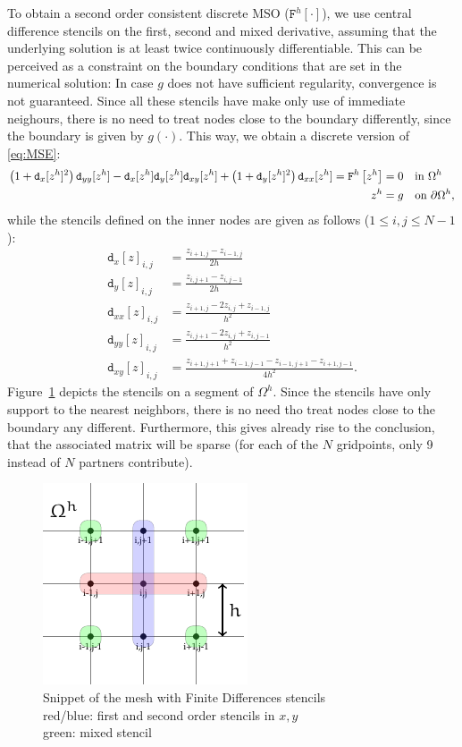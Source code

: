 \documentclass[11pt]{scrartcl}
\newcommand{\mSurfDisc}[1]{\ensuremath{\mathtt{F}^h\left[#1\right]}}
\newcommand{\Dx}[1]{\ensuremath{\mathtt{d}_x[#1]}}
\newcommand{\Dy}[1]{\ensuremath{\mathtt{d}_y[#1]}}
\newcommand{\Dxx}[1]{\ensuremath{\mathtt{d}_{xx}[#1]}}
\newcommand{\Dyy}[1]{\ensuremath{\mathtt{d}_{yy}[#1]}}
\newcommand{\Dxy}[1]{\ensuremath{\mathtt{d}_{xy}[#1]}}
\begin{document}
To obtain a second order consistent discrete MSO ($\mSurfDisc{\cdot}$), we use central difference stencils on the first, second and mixed derivative, assuming that the underlying solution is at least twice continuously differentiable. This can be perceived as a constraint on the boundary conditions that are set in the numerical solution: In case $g$ does not have sufficient regularity, convergence is not guaranteed. Since all these stencils have make only use of immediate neighours, there is no need to treat nodes close to the boundary differently, since the boundary is given by $g(\cdot)$.
\newpage 
This way, we obtain a discrete version of \eqref{eq:MSE}:
\begin{align}
	\left(1+\Dx{z^h}^2\right)\Dyy{z^h}-\Dx{z^h} \Dy{z^h}\Dxy{z^h} + \left(1+\Dy{z^h}^2\right)\Dxx{z^h} = \mSurfDisc{z^h} &= 0  \quad \text{in } \Omega^h \notag \\
	z^h &= g \quad \text{on } \partial\Omega^h \label{eq:dMSE},
\end{align}
while the stencils defined on the inner nodes are given as follows ($1 \le i,j \le N-1$):
\begin{align}
	\Dx{z}_{i,j} &= \frac{z_{i+1,j}-z_{i-1,j}}{2h}\label{eq:dx} \\
	\Dy{z}_{i,j} &= \frac{z_{i,j+1}-z_{i,j-1}}{2h}\label{eq:dy} \\
	\Dxx{z}_{i,j} &= \frac{z_{i+1,j} - 2z_{i,j} + z_{i-1,j}}{h^2}\label{eq:dxx}\\
	\Dyy{z}_{i,j} &= \frac{z_{i,j+1} - 2z_{i,j} + z_{i,j-1}}{h^2}\label{eq:dyy}\\
	\Dxy{z}_{i,j} &= \frac{z_{i+1,j+1} + z_{i-1,j-1} - z_{i-1,j+1}-z_{i+1,j-1}}{4h^2}\label{eq:dxy}. 
\end{align}
Figure~\ref{fig:fdmmesh} depicts the stencils on a segment of $\Omega^h$.
Since the stencils have only support to the nearest neighbors, there is no need tho treat nodes close to the boundary any different. Furthermore, this gives already rise to the conclusion, that the associated matrix will be sparse (for each of the $N$ gridpoints, only 9 instead of $N$ partners contribute).

\begin{figure}
	\centering
	\includegraphics[width=.4\linewidth]{figs/FDMMesh}
	\caption{Snippet of the mesh with Finite Differences stencils\\red/blue: first and second order stencils in $x,y$\\
	green: mixed stencil}\label{fig:fdmmesh}
\end{figure}
\newpage
\end{document}
